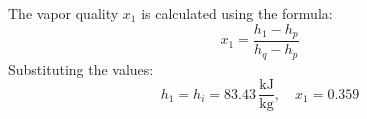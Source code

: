 The vapor quality \( x_1 \) is calculated using the formula:  
\[
x_1 = \frac{h_1 - h_p}{h_q - h_p}
\]  
Substituting the values:  
\[
h_1 = h_i = 83.43 \, \frac{\text{kJ}}{\text{kg}}, \quad x_1 = 0.359
\]